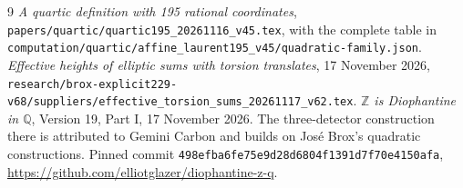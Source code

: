 \documentclass[11pt,a4paper]{article}
\newcommand{\Q}{\mathbb Q}\newcommand{\Z}{\mathbb Z}
\begin{document}
\begin{thebibliography}{9}
\emph{A quartic definition with 195 rational coordinates},
\nolinkurl{papers/quartic/quartic195_20261116_v45.tex},
with the complete table in
\nolinkurl{computation/quartic/affine_laurent195_v45/quadratic-family.json}.
\emph{Effective heights of elliptic sums with torsion translates},
17 November 2026,
\nolinkurl{research/brox-explicit229-v68/suppliers/effective_torsion_sums_20261117_v62.tex}.
\emph{$\Z$ is Diophantine in $\Q$}, Version 19, Part I,
17 November 2026. The three-detector construction there is attributed
to Gemini Carbon and builds on Jos\'e Brox's quadratic constructions.
Pinned commit
\texttt{498efba6fe75e9d28d6804f1391d7f70e4150afa},
\url{https://github.com/elliotglazer/diophantine-z-q}.
\end{thebibliography}
\end{document}
